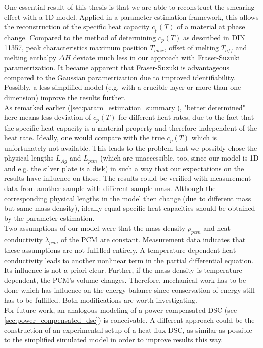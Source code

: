 \documentclass{scrartcl}[12pt, halfparskip]
\numberwithin{equation}{section}
\numberwithin{figure}{section}
\numberwithin{table}{section}
\begin{document}
One essential result of this thesis is that we are able to reconstruct the smearing effect with a 1D model. Applied in a parameter estimation framework, this allows the reconstruction of the specific heat capacity $c_p(T)$ of a material at phase change. Compared to the method of determining $c_p(T)$ as described in DIN 11357, peak characteristics maximum position $T_{max}$, offset of melting $T_{off}$ and melting enthalpy $\Delta H$ deviate much less in our approach with Fraser-Suzuki parametrization. 
It became apparent that Fraser-Suzuki is advantageous compared to the Gaussian parametrization due to improved identifiability.
Possibly, a less simplified model (e.g. with a crucible layer or more than one dimension) improve the results further. \\
As remarked earlier (\cref{sec:param_estimation_summary}), "better determined" here means less deviation of $c_p(T)$ for different heat rates, due to the fact that the specific heat capacity is a material property and therefore independent of the heat rate. 
Ideally, one would compare with the true $c_p(T)$ which is unfortunately not available. 
This leads to the problem that we possibly chose the physical lengths $L_{Ag}$ and $L_{pcm}$ (which are unaccessible, too, since our model is 1D and e.g. the silver plate is a disk) in such a way that our expectations on the results have influence on those. 
The results could be verified  with measurement data from another sample with different sample mass. Although the corresponding physical lengths in the model then change (due to different mass but same mass density), ideally equal specific heat capacities should be obtained by the parameter estimation. \\
Two assumptions of our model were that the mass density $\rho_{pcm}$ and heat conductivity $\lambda_{pcm}$ of the PCM are constant. 
Measurement data indicates that these assumptions are not fulfilled entirely. 
A temperature dependent heat conductivity leads to another nonlinear term in the partial differential equation. 
Its influence is not a priori clear. 
Further, if the mass density is temperature dependent, the PCM's volume changes. 
Therefore, mechanical work has to be done which has influence on the energy balance since conservation of energy still has to be fulfilled. 
Both modifications are worth investigating. \\
For future work, an analogous modeling of a power compensated DSC (see \cref{sec:power_compensated_dsc}) is conceivable. 
A different approach could be the construction of an experimental setup of a heat flux DSC, as similar as possible to the simplified simulated model in order to improve results this way. \\
\end{document}
